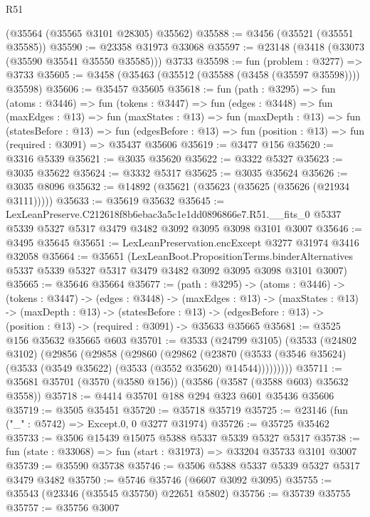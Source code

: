 \begin{lexlean}{R51}
\begin{coremodule}
    (@35564 (@35565 @3101 @28305) @35562)
@35588 := @3456 (@35521 (@35551 @35585))
@35590 := @23358 @31973 @33068
@35597 := @23148 (@3418 (@33073 (@35590 @35541 @35550 @35585))) @3733
@35598 := fun (problem : @3277) => @3733
@35605 := @3458 (@35463 (@35512 (@35588 (@3458 (@35597 @35598)))) @35598)
@35606 := @35457 @35605
@35618 := fun (path : @3295) =>
  fun (atoms : @3446) =>
  fun (tokens : @3447) =>
  fun (edges : @3448) =>
  fun (maxEdges : @13) =>
  fun (maxStates : @13) =>
  fun (maxDepth : @13) =>
  fun (statesBefore : @13) =>
  fun (edgesBefore : @13) => fun (position : @13) => fun (required : @3091) => @35437 @35606
@35619 := @3477 @156
@35620 := @3316 @5339
@35621 := @3035 @35620
@35622 := @3322 @5327
@35623 := @3035 @35622
@35624 := @3332 @5317
@35625 := @3035 @35624
@35626 := @3035 @8096
@35632 := @14892 (@35621 (@35623 (@35625 (@35626 (@21934 @3111)))))
@35633 := @35619 @35632
@35645 := LexLeanPreserve.C212618f8b6ebac3a5c1e1dd0896866e7.R51.__fits_0
    @5337
    @5339
    @5327
    @5317
    @3479
    @3482
    @3092
    @3095
    @3098
    @3101
    @3007
@35646 := @3495 @35645
@35651 := LexLeanPreservation.encExcept @3277 @31974 @3416 @32058
@35664 := @35651
    (LexLeanBoot.PropositionTerms.binderAlternatives
      @5337
      @5339
      @5327
      @5317
      @3479
      @3482
      @3092
      @3095
      @3098
      @3101
      @3007)
@35665 := @35646 @35664
@35677 := (path : @3295) ->
  (atoms : @3446) ->
  (tokens : @3447) ->
  (edges : @3448) ->
  (maxEdges : @13) ->
  (maxStates : @13) ->
  (maxDepth : @13) ->
  (statesBefore : @13) ->
  (edgesBefore : @13) -> (position : @13) -> (required : @3091) -> @35633 @35665
@35681 := @3525 @156 @35632 @35665 @603
@35701 := @3533
    (@24799 @3105)
    (@3533
      (@24802 @3102)
      (@29856
        (@29858
          (@29860
            (@29862
              (@23870
                (@3533 (@3546 @35624) (@3533 (@3549 @35622) (@3533 (@3552 @35620) @14544)))))))))
@35711 := @35681 @35701 (@3570 (@3580 @156)) (@3586 (@3587 (@3588 @603) @35632 @3558))
@35718 := @4414 @35701 @188 @294 @323 @601 @35436 @35606
@35719 := @3505 @35451
@35720 := @35718 @35719
@35725 := @23146 (fun ("_" : @5742) => Except.{0, 0} @3277 @31974)
@35726 := @35725 @35462
@35733 := @3506 @15439 @15075 @5388 @5337 @5339 @5327 @5317
@35738 := fun (state : @33068) => fun (start : @31973) => @33204 @35733 @3101 @3007
@35739 := @35590 @35738
@35746 := @3506 @5388 @5337 @5339 @5327 @5317 @3479 @3482
@35750 := @5746 @35746 (@6607 @3092 @3095)
@35755 := @35543 (@23346 (@35545 @35750) @22651 @5802)
@35756 := @35739 @35755
@35757 := @35756 @3007

\end{coremodule}
\end{lexlean}
